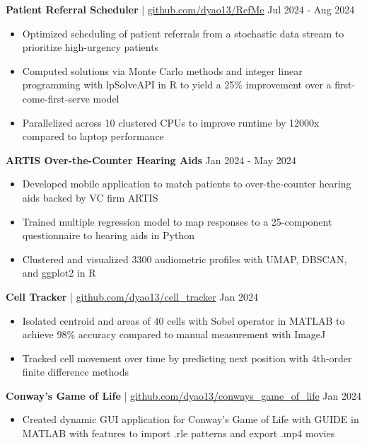 \documentclass[11pt]{article}       %
\begin{document}
\textbf{Patient Referral Scheduler} | \href{https://github.com/dyao13/RefMe}{github.com/dyao13/RefMe} \hfill Jul 2024 - Aug 2024 \vspace{-9pt} \\
\begin{itemize}
  \item Optimized scheduling of patient referrals from a stochastic data stream to prioritize high-urgency patients 
  \item Computed solutions via Monte Carlo methods and integer linear programming with lpSolveAPI in R to yield a 25\% improvement over a first-come-first-serve model
  \item Parallelized across 10 clustered CPUs to improve runtime by 12000x compared to laptop performance
\end{itemize}

\textbf{ARTIS Over-the-Counter Hearing Aids} \hfill Jan 2024 - May 2024 \vspace{-9pt} \\
\begin{itemize}
  \item Developed mobile application to match patients to over-the-counter hearing aids backed by VC firm ARTIS
  \item Trained multiple regression model to map responses to a 25-component questionnaire to hearing aids in Python
  \item Clustered and visualized 3300 audiometric profiles with UMAP, DBSCAN, and ggplot2 in R
\end{itemize}

\textbf{Cell Tracker} | \href{https://github.com/dyao13/cell_tracker}{github.com/dyao13/cell\_tracker} \hfill Jan 2024 \vspace{-9pt} \\
\begin{itemize}
  \item Isolated centroid and areas of 40 cells with Sobel operator in MATLAB to achieve 98\% accuracy compared to manual measurement with ImageJ
  \item Tracked cell movement over time by predicting next position with 4th-order finite difference methods
\end{itemize}

\textbf{Conway’s Game of Life} | \href{https://github.com/dyao13/conways_game_of_life}{github.com/dyao13/conways\_game\_of\_life} \hfill Jan 2024 \vspace{-9pt} \\
\begin{itemize}
  \item Created dynamic GUI application for Conway’s Game of Life with GUIDE in MATLAB with features to import .rle patterns and export .mp4 movies
\end{itemize}
\end{document}
